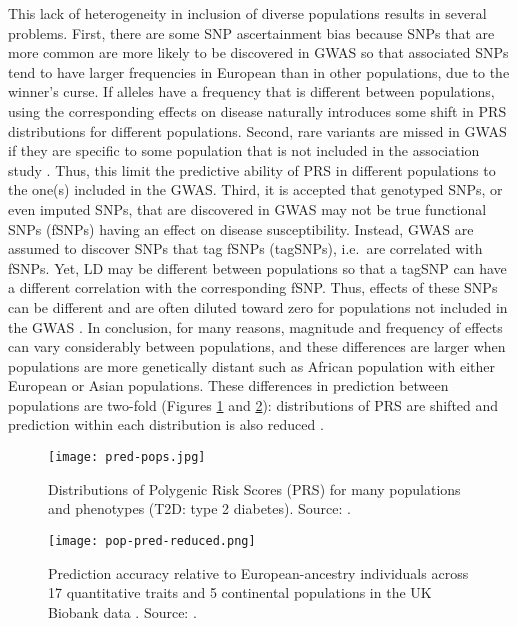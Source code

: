 This lack of heterogeneity in inclusion of diverse populations results in several problems. First, there are some SNP ascertainment bias because SNPs that are more common are more likely to be discovered in GWAS so that associated SNPs tend to have larger frequencies in European than in other populations, due to the winner's curse. 
If alleles have a frequency that is different between populations, using the corresponding effects on disease naturally introduces some shift in PRS distributions for different populations.
Second, rare variants are missed in GWAS if they are specific to some population that is not included in the association study \cite[]{martin2019clinical}. Thus, this limit the predictive ability of PRS in different populations to the one(s) included in the GWAS.
Third, it is accepted that genotyped SNPs, or even imputed SNPs, that are discovered in GWAS may not be true functional SNPs (fSNPs) having an effect on disease susceptibility. Instead, GWAS are assumed to discover SNPs that tag fSNPs (tagSNPs), i.e.\ are correlated with fSNPs. 
Yet, LD may be different between populations so that a tagSNP can have a different correlation with the corresponding fSNP. Thus, effects of these SNPs can be different and are often diluted toward zero for populations not included in the GWAS \cite[]{carlson2013generalization}. 
In conclusion, for many reasons, magnitude and frequency of effects can vary considerably between populations, and these differences are larger when populations are more genetically distant such as African population with either European or Asian populations.
These differences in prediction between populations are two-fold (Figures \ref{fig:dist-shift} and \ref{fig:pop-pred}): distributions of PRS are shifted and prediction within each distribution is also reduced \cite[]{vilhjalmsson2015modeling,martin2019clinical}.

\begin{figure}[htpb]
\centerline{\texttt{[image: pred-pops.jpg]}}
\caption{Distributions of Polygenic Risk Scores (PRS) for many populations and phenotypes (T2D: type 2 diabetes). Source: \cite{martin2017human}.}
\label{fig:dist-shift}
\end{figure}

\begin{figure}[htpb]
\centerline{\texttt{[image: pop-pred-reduced.png]}}
\caption{Prediction accuracy relative to European-ancestry individuals across 17 quantitative traits and 5 continental populations in the UK Biobank data \cite[]{bycroft2017genome}. Source: \cite{martin2019clinical}.}
\label{fig:pop-pred}
\end{figure}


